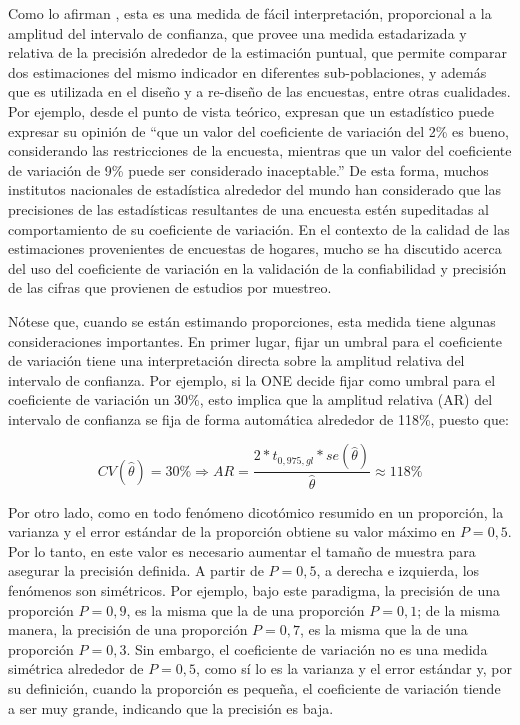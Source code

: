 \documentclass[
  10pt,
  spanish,
]{book}
\begin{document}
Como lo afirman \citet{Singh_Westlake_Feder_2004}, esta es una medida de fácil interpretación, proporcional a la amplitud del intervalo de confianza, que provee una medida estadarizada y relativa de la precisión alrededor de la estimación puntual, que permite comparar dos estimaciones del mismo indicador en diferentes sub-poblaciones, y además que es utilizada en el diseño y a re-diseño de las encuestas, entre otras cualidades. Por ejemplo, desde el punto de vista teórico, \citet{Sarndal_Swensson_Wretman_2003} expresan que un estadístico puede expresar su opinión de ``que un valor del coeficiente de variación del 2\% es bueno, considerando las restricciones de la encuesta, mientras que un valor del coeficiente de variación de 9\% puede ser considerado inaceptable.'' De esta forma, muchos institutos nacionales de estadística alrededor del mundo han considerado que las precisiones de las estadísticas resultantes de una encuesta estén supeditadas al comportamiento de su coeficiente de variación. En el contexto de la calidad de las estimaciones provenientes de encuestas de hogares, mucho se ha discutido acerca del uso del coeficiente de variación en la validación de la confiabilidad y precisión de las cifras que provienen de estudios por muestreo.

Nótese que, cuando se están estimando proporciones, esta medida tiene algunas consideraciones importantes. En primer lugar, fijar un umbral para el coeficiente de variación tiene una interpretación directa sobre la amplitud relativa del intervalo de confianza. Por ejemplo, si la ONE decide fijar como umbral para el coeficiente de variación un 30\%, esto implica que la amplitud relativa (AR) del intervalo de confianza se fija de forma automática alrededor de 118\%, puesto que:

\[
CV(\hat\theta) = 30\% 
\Rightarrow 
AR = \frac{2*t_{0,975, gl} * se(\hat\theta)}{\hat\theta} \approx 118\%
\]

Por otro lado, como en todo fenómeno dicotómico resumido en un proporción, la varianza y el error estándar de la proporción obtiene su valor máximo en \(P=0,5\). Por lo tanto, en este valor es necesario aumentar el tamaño de muestra para asegurar la precisión definida. A partir de \(P=0,5\), a derecha e izquierda, los fenómenos son simétricos. Por ejemplo, bajo este paradigma, la precisión de una proporción \(P=0,9\), es la misma que la de una proporción \(P=0,1\); de la misma manera, la precisión de una proporción \(P=0,7\), es la misma que la de una proporción \(P=0,3\). Sin embargo, el coeficiente de variación no es una medida simétrica alrededor de \(P=0,5\), como sí lo es la varianza y el error estándar y, por su definición, cuando la proporción es pequeña, el coeficiente de variación tiende a ser muy grande, indicando que la precisión es baja.
\end{document}
